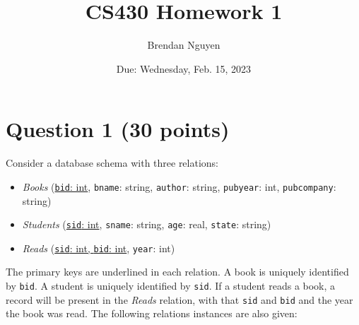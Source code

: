 \documentclass[letterpaper, 11pt]{article}
\title{CS430 Homework 1}
\author{Brendan Nguyen}
\date{Due: Wednesday, Feb. 15, 2023}
\begin{document}
\maketitle

\section*{Question 1 (30 points)}

Consider a database schema with three relations:
\begin{itemize}
    \item \textit{Books} (\ul{\texttt{bid}: int}, \texttt{bname}: string, \texttt{author}: string, \texttt{pubyear}: int, \texttt{pubcompany}: string)
    \item \textit{Students} (\ul{\texttt{sid}: int}, \texttt{sname}: string, \texttt{age}: real, \texttt{state}: string)
    \item \textit{Reads} (\ul{\texttt{sid}: int, \texttt{bid}: int}, \texttt{year}: int)
\end{itemize}

The primary keys are underlined in each relation. A book is uniquely identified by \texttt{bid}. A student is uniquely identified by \texttt{sid}. If a student reads a book, a record will be present in the \textit{Reads} relation, with that \texttt{sid} and \texttt{bid} and the year the book was read. The following relations instances are also given:
\end{document}
